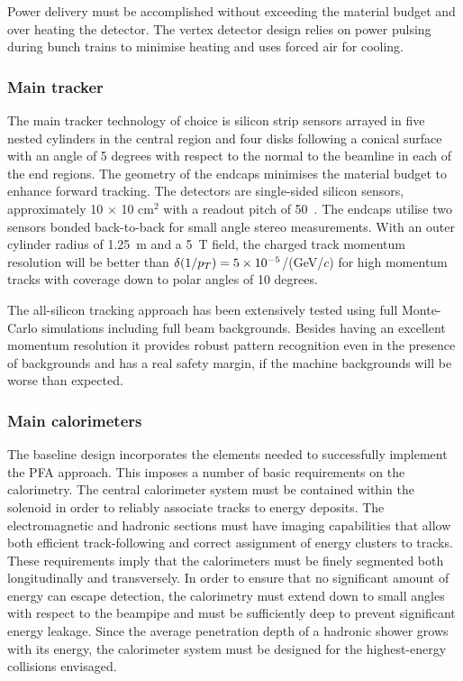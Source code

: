 Power delivery must be accomplished without exceeding the material budget and
over heating the detector.  The vertex detector 
design relies on power pulsing during bunch trains to minimise heating 
and uses forced air for cooling. 

\subsubsection{Main tracker}
The main tracker technology of
choice is silicon strip sensors arrayed in five nested cylinders in the central
region and four disks following a conical surface with an angle of 5 degrees
with respect to the normal to the beamline in each of the end regions. The geometry of the endcaps
minimises the material budget to enhance forward tracking. The detectors are
single-sided silicon sensors, approximately 10 $\times$ 10 cm$^2$ with a readout
pitch of 50~\micron. The endcaps utilise two sensors bonded back-to-back for
small angle stereo measurements. With an outer cylinder radius of 1.25~m
and a 5~T field, the charged track momentum resolution will be better than
$\delta (1/p_T) = 5 \times 10^{-5} $/(GeV/$c$) for high momentum tracks with coverage down to polar angles of 10 degrees.

The all-silicon tracking approach has been extensively tested using full Monte-Carlo
simulations including full beam backgrounds. Besides having an excellent momentum resolution
it provides robust pattern recognition even in the presence of backgrounds and has a
real safety margin, if the machine backgrounds will be worse than expected.

\subsubsection{Main calorimeters}

The \sid baseline design incorporates the elements needed to
successfully implement the PFA approach. This imposes a number of
basic requirements on the calorimetry. The central calorimeter
system must be contained within the solenoid in order to reliably associate
tracks to energy deposits. The electromagnetic and hadronic sections
must have imaging capabilities that allow both efficient
track-following and correct assignment of energy clusters to tracks. These
requirements imply that the calorimeters must be finely segmented both
longitudinally and transversely. In order to ensure that no significant amount
of energy can escape detection, the calorimetry must extend down to small
angles with respect to the beampipe and must be sufficiently deep to prevent
significant energy leakage. Since the average penetration depth of a hadronic
shower grows with its energy, the calorimeter system must be designed for the
highest-energy collisions envisaged.

